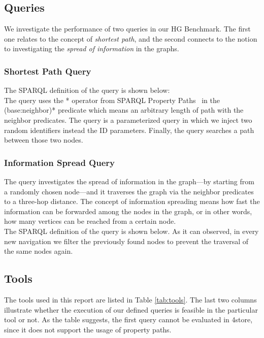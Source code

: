 \subsection{Queries}

We investigate the performance of two queries in our HG Benchmark. The first one relates to the concept of \textit{shortest path}, and the second connects to the notion to investigating the \textit{spread of information} in the graphs.

\subsubsection{Shortest Path Query}

The SPARQL definition of the query is shown below:\\


The query uses the \textsf{*} operator from SPARQL Property Paths~\cite{property_path} in the \textsf{(base:neighbor)*} predicate which means an arbitrary length of path with the \textsf{neighbor} predicates. The query is a parameterized query in which we inject two random identifiers instead the \textsf{ID} parameters. Finally, the query searches a path between those two nodes.

\subsubsection{Information Spread Query}
The query investigates the spread of information in the graph---by starting from a randomly chosen node---and it traverses the graph via the \textsf{neighbor} predicates to a three-hop distance. The concept of information spreading means how fast the information can be forwarded among the nodes in the graph, or in other words, how many vertices can be reached from a certain node.\\
The SPARQL definition of the query is shown below. As it can observed, in every new navigation we filter the previously found nodes to prevent the traversal of the same nodes again.



\subsection{Tools}

The tools used in this report are listed in Table \ref{tab:tools}. The last two columns illustrate whether the execution of our defined queries is feasible in the particular tool or not. As the table suggests, the first query cannot be evaluated in \textsf{4store}, since it does not support the usage of property paths.

